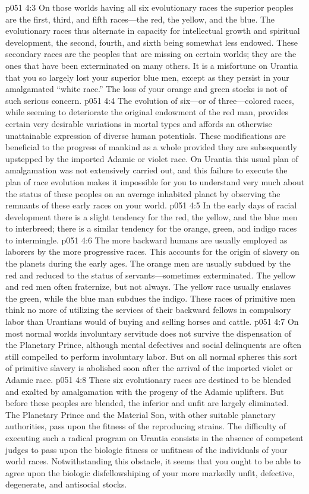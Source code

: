 \vs p051 4:3 On those worlds having all six evolutionary races the superior peoples are the first, third, and fifth races---the red, the yellow, and the blue. The evolutionary races thus alternate in capacity for intellectual growth and spiritual development, the second, fourth, and sixth being somewhat less endowed. These secondary races are the peoples that are missing on certain worlds; they are the ones that have been exterminated on many others. It is a misfortune on Urantia that you so largely lost your superior blue men, except as they persist in your amalgamated “white race.” The loss of your orange and green stocks is not of such serious concern.\plusone
\vs p051 4:4 The evolution of six---or of three---colored races, while seeming to deteriorate the original endowment of the red man, provides certain very desirable variations in mortal types and affords an otherwise unattainable expression of diverse human potentials. These modifications are beneficial to the progress of mankind as a whole provided they are subsequently upstepped by the imported Adamic or violet race. On Urantia this usual plan of amalgamation was not extensively carried out, and this failure to execute the plan of race evolution makes it impossible for you to understand very much about the status of these peoples on an average inhabited planet by observing the remnants of these early races on your world.
\pc \vs p051 4:5 In the early days of racial development there is a slight tendency for the red, the yellow, and the blue men to interbreed; there is a similar tendency for the orange, green, and indigo races to intermingle.
\vs p051 4:6 The more backward humans are usually employed as laborers by the more progressive races. This accounts for the origin of slavery on the planets during the early ages. The orange men are usually subdued by the red and reduced to the status of servants---sometimes exterminated. The yellow and red men often fraternize, but not always. The yellow race usually enslaves the green, while the blue man subdues the indigo. These races of primitive men think no more of utilizing the services of their backward fellows in compulsory labor than Urantians would of buying and selling horses and cattle.
\vs p051 4:7 On most normal worlds involuntary servitude does not survive the dispensation of the Planetary Prince, although mental defectives and social delinquents are often still compelled to perform involuntary labor. But on all normal spheres this sort of primitive slavery is abolished soon after the arrival of the imported violet or Adamic race.
\vs p051 4:8 These six evolutionary races are destined to be blended and exalted by amalgamation with the progeny of the Adamic uplifters. But before these peoples are blended, the inferior and unfit are largely eliminated. The Planetary Prince and the Material Son, with other suitable planetary authorities, pass upon the fitness of the reproducing strains. The difficulty of executing such a radical program on Urantia consists in the absence of competent judges to pass upon the biologic fitness or unfitness of the individuals of your world races. Notwithstanding this obstacle, it seems that you ought to be able to agree upon the biologic disfellowshiping of your more markedly unfit, defective, degenerate, and antisocial stocks.
